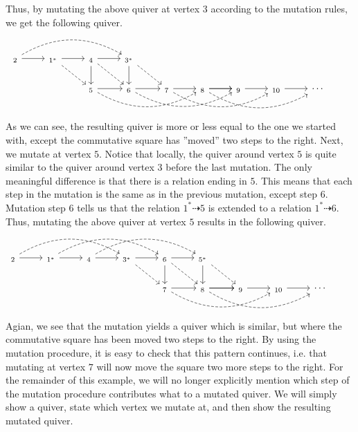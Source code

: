\documentclass[12pt, dvipsnames, oneside]{amsart}
\theoremstyle{definition}
\begin{document}
Thus, by mutating the above quiver at vertex $3$ according to the mutation rules, we get the following quiver. 
\begin{equation*}
\begin{tikzcd}
_2  \arrow[r] \arrow[rrr, dashed, bend left] & _{1^*} \arrow[r] \arrow[dr, dashed] & _4 \arrow[d] \arrow[r] \arrow[dr, dashed] & _{3^*} \arrow[d] \arrow[dr, dashed] & & & & &\\
 &  & _5 \arrow[r] \arrow[rrr, bend right, dashed] & _6 \arrow[r] \arrow[rrr, bend right, dashed] & _7 \arrow[r] \arrow[rrr, bend right, dashed] & _8 \arrow[r] \arrow[r] \arrow[rrr, bend right, dashed] & _9 \arrow[r] & _{10} \arrow[r] & \cdots & 
\end{tikzcd}
\end{equation*}
As we can see, the resulting quiver is more or less equal to the one we started with, except the commutative square has ''moved'' two steps to the right. 
Next, we mutate at vertex $5$. Notice that locally, the quiver around vertex $5$ is quite similar to the quiver around vertex $3$ before the last mutation. The only meaningful difference is that there is a relation ending in $5$. This means that each step in the mutation is the same as in the previous mutation, except step $6$. Mutation step $6$ tells us that the relation $1^*\dashrightarrow 5$ is extended to a relation $1^*\dashrightarrow 6$. 
Thus, mutating the above quiver at vertex $5$ results in the following quiver.
\begin{equation*}
\begin{tikzcd}
_2  \arrow[r] \arrow[rrr, dashed, bend left] & _{1^*} \arrow[r] \arrow[rrr, bend left, dashed] & _4  \arrow[r] \arrow[rrr, bend left, dashed] & _{3^*} \arrow[r] \arrow[dr, dashed] & _6 \arrow[d] \arrow[r] \arrow[dr, dashed] & _{5^*} \arrow[d] \arrow[dr, dashed] & & &\\
 & & & & _7 \arrow[r] \arrow[rrr, bend right, dashed] & _8 \arrow[r] \arrow[r] \arrow[rrr, bend right, dashed]& _9 \arrow[r] & _{10} \arrow[r] & \cdots & 
\end{tikzcd}
\end{equation*} 
Agian, we see that the mutation yields a quiver which is similar, but where the commutative square has been moved two steps to the right.
By using the mutation procedure, it is easy to check that this pattern continues, i.e. that mutating at vertex $7$ will now move the square two more steps to the right. For the remainder of this example, we will no longer explicitly mention which step of the mutation procedure contributes what to a mutated quiver. We will simply show a quiver, state which vertex we mutate at, and then show the resulting mutated quiver.
\end{document}
